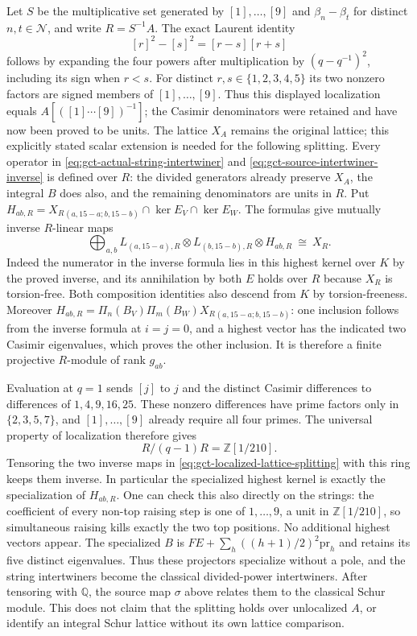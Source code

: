Let $S$ be the multiplicative set generated by $[1],\ldots,[9]$
and $\beta_n-\beta_t$ for distinct $n,t\in\mathcal N$,
and write $R=S^{-1}A$. The exact Laurent identity
\[
 [r]^2-[s]^2=[r-s][r+s]
\]
follows by expanding the four powers after multiplication by
$(q-q^{-1})^2$, including its sign when $r<s$.
For distinct $r,s\in\{1,2,3,4,5\}$ its two nonzero factors
are signed members of $[1],\ldots,[9]$. Thus this displayed
localization equals $A[([1]\cdots[9])^{-1}]$; the Casimir
denominators were retained and have now been proved to be units.
The lattice $X_A$ remains the original
lattice; this explicitly stated scalar extension is needed for
the following splitting. Every operator in
\eqref{eq:gct-actual-string-intertwiner} and
\eqref{eq:gct-source-intertwiner-inverse} is defined over $R$:
the divided generators already preserve $X_A$, the integral
$B$ does also, and the remaining denominators are units in $R$.
Put $H_{ab,R}=X_R{}_{(a,15-a;b,15-b)}\cap\ker E_V\cap\ker E_W$.
The formulas give mutually inverse $R$-linear maps
\begin{equation}
 \bigoplus_{a,b}L_{(a,15-a),R}\otimes
 L_{(b,15-b),R}\otimes H_{ab,R}\ \cong\ X_R.
 \label{eq:gct-localized-lattice-splitting}
\end{equation}
Indeed the numerator in the inverse formula lies in this highest
kernel over $K$ by the proved inverse, and its annihilation by
both $E$ holds over $R$ because $X_R$ is torsion-free. Both
composition identities also descend from $K$ by torsion-freeness.
Moreover
$H_{ab,R}=\Pi_n(B_V)\Pi_m(B_W)X_R{}_{(a,15-a;b,15-b)}$:
one inclusion follows from the inverse formula at $i=j=0$,
and a highest vector has the indicated two Casimir eigenvalues,
which proves the other inclusion. It is therefore a finite
projective $R$-module of rank $g_{ab}$.

Evaluation at $q=1$ sends $[j]$ to $j$ and the distinct
Casimir differences to differences of $1,4,9,16,25$.
These nonzero differences have prime factors only in
$\{2,3,5,7\}$, and $[1],\ldots,[9]$ already require all four
primes. The universal property of localization therefore gives
\[
 R/(q-1)R=\mathbb Z[1/210].
\]
Tensoring the two inverse maps in
\eqref{eq:gct-localized-lattice-splitting} with this ring keeps
them inverse. In particular the specialized highest kernel is
exactly the specialization of $H_{ab,R}$. One can check this
also directly on the strings: the coefficient of every
non-top raising step is one of $1,\ldots,9$, a unit in
$\mathbb Z[1/210]$, so simultaneous raising kills exactly
the two top positions. No additional highest vectors appear.
The specialized $B$ is
$FE+\sum_h((h+1)/2)^2\mathrm{pr}_h$ and retains its five
distinct eigenvalues. Thus these projectors specialize without
a pole, and the string intertwiners become the classical
divided-power intertwiners. After tensoring with $\mathbb Q$,
the source map $\sigma$ above relates them to the classical
Schur module. This does not claim that the splitting holds
over unlocalized $A$, or identify an integral Schur lattice
without its own lattice comparison.

